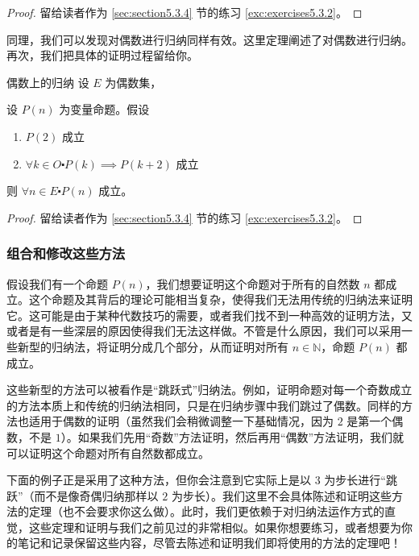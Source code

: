 \begin{proof}
    留给读者作为 \ref{sec:section5.3.4} 节的练习 \ref{exc:exercises5.3.2}。
\end{proof}

同理，我们可以发现对偶数进行归纳同样有效。这里定理阐述了对偶数进行归纳。再次，我们把具体的证明过程留给你。

\begin{theorem}{偶数上的归纳}\label{theorem5.3.6}
    设 $E$ 为偶数集，

    设 $P(n)$ 为变量命题。假设

    \begin{enumerate}[label=(\arabic*)]
        \item $P(2)$ 成立
        \item $\forall k \in O \centerdot P(k) \implies P(k + 2)$ 成立
    \end{enumerate}

    则 $\forall n \in E \centerdot P(n)$ 成立。
\end{theorem}

\begin{proof}
    留给读者作为 \ref{sec:section5.3.4} 节的练习 \ref{exc:exercises5.3.2}。
\end{proof}


\subsubsection*{组合和修改这些方法}

假设我们有一个命题 $P(n)$，我们想要证明这个命题对于所有的自然数 $n$ 都成立。这个命题及其背后的理论可能相当复杂，使得我们无法用传统的归纳法来证明它。这可能是由于某种代数技巧的需要，或者我们找不到一种高效的证明方法，又或者是有一些深层的原因使得我们无法这样做。不管是什么原因，我们可以采用一些新型的归纳法，将证明分成几个部分，从而证明对所有 $n \in \mathbb{N}$，命题 $P(n)$ 都成立。

这些新型的方法可以被看作是``跳跃式''归纳法。例如，证明命题对每一个奇数成立的方法本质上和传统的归纳法相同，只是在归纳步骤中我们跳过了偶数。同样的方法也适用于偶数的证明（虽然我们会稍微调整一下基础情况，因为 $2$ 是第一个偶数，不是 $1$）。如果我们先用``奇数''方法证明，然后再用``偶数''方法证明，我们就可以证明这个命题对所有自然数都成立。

下面的例子正是采用了这种方法，但你会注意到它实际上是以 $3$ 为步长进行``跳跃''（而不是像奇偶归纳那样以 $2$ 为步长）。我们这里不会具体陈述和证明这些方法的定理（也不会要求你这么做）。此时，我们更依赖于对归纳法运作方式的直觉，这些定理和证明与我们之前见过的非常相似。如果你想要练习，或者想要为你的笔记和记录保留这些内容，尽管去陈述和证明我们即将使用的方法的定理吧！

